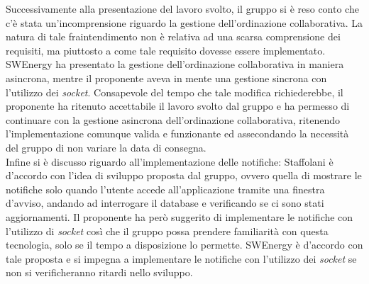 Successivamente alla presentazione del lavoro svolto, il gruppo si è reso conto che c'è stata un'incomprensione riguardo la gestione dell'ordinazione collaborativa.
La natura di tale fraintendimento non è relativa ad una scarsa comprensione dei requisiti, ma piuttosto a come tale requisito dovesse essere implementato.
SWEnergy ha presentato la gestione dell'ordinazione collaborativa in maniera asincrona, mentre il proponente aveva in mente una gestione sincrona con l'utilizzo dei \textit{socket}.
Consapevole del tempo che tale modifica richiederebbe, il proponente ha ritenuto accettabile il lavoro svolto dal gruppo e ha permesso di continuare con la gestione asincrona dell'ordinazione collaborativa, ritenendo l'implementazione comunque valida e funzionante ed assecondando la necessità del gruppo di non variare la data di consegna. \\
Infine si è discusso riguardo all'implementazione delle notifiche: Staffolani è d'accordo con l'idea di sviluppo proposta dal gruppo, ovvero quella di mostrare le notifiche 
solo quando l'utente accede all'applicazione tramite una finestra d'avviso, andando ad interrogare il database e verificando se ci sono stati aggiornamenti. Il proponente ha però 
suggerito di implementare le notifiche con l'utilizzo di \textit{socket} così che il gruppo possa prendere familiarità con questa tecnologia, solo se il tempo a disposizione lo permette.
SWEnergy è d'accordo con tale proposta e si impegna a implementare le notifiche con l'utilizzo dei \textit{socket} se non si verificheranno ritardi nello sviluppo.


